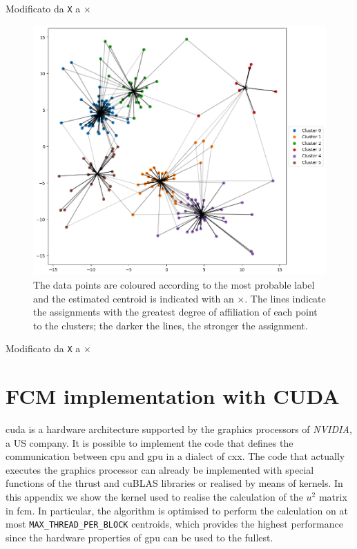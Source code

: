 \begin{modified}
Modificato da \texttt{X} a $\times$
\end{modified}
\begin{figure}[h]
    \centering
    \includegraphics[width=0.9\linewidth]{Figures/dati_fcm.png}
    \caption[example of \gls{fcm} clustering]{The data points are coloured according to the most probable label and the estimated centroid is indicated with an $\times$. The lines indicate the assignments with the greatest degree of affiliation of each point to the clusters; the darker the lines, the stronger the assignment.}
    \label{fig:data_fcm}
\end{figure}
\begin{modified}
Modificato da \texttt{X} a $\times$
\end{modified}

\chapter{FCM implementation with CUDA} \label{appendix:fcm_kernel}
\gls{cuda} is a hardware architecture supported by the graphics processors of \emph{NVIDIA}, a US company. It is possible to implement the code that defines the communication between \gls{cpu} and \gls{gpu} in a dialect of \gls{cxx}. The code that actually executes the graphics processor can already be implemented with special functions of the \gls{thrust} and \gls{cuBLAS} libraries or realised by means of kernels. In this appendix we show the kernel used to realise the calculation of the $u^2$ matrix in \gls{fcm}. In particular, the algorithm is optimised to perform the calculation on at most \texttt{MAX\_THREAD\_PER\_BLOCK} centroids, which provides the highest performance since the hardware properties of \gls{gpu} can be used to the fullest.

